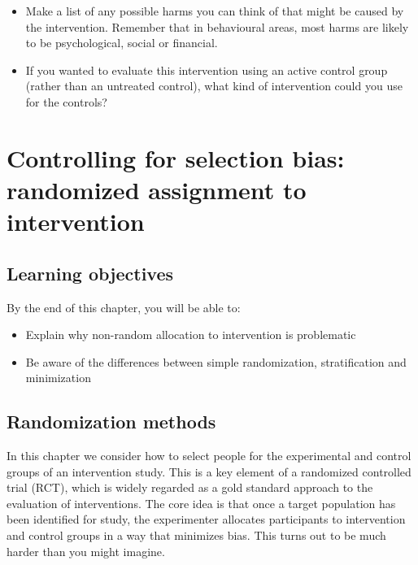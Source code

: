 \documentclass{krantz}
\providecommand{\tightlist}{%
\setlength{\itemsep}{0pt}\setlength{\parskip}{0pt}}
\begin{document}
\begin{itemize}
\tightlist
\item
  Make a list of any possible harms you can think of that might be caused by the intervention. Remember that in behavioural areas, most harms are likely to be psychological, social or financial.
\item
  If you wanted to evaluate this intervention using an active control group (rather than an untreated control), what kind of intervention could you use for the controls?
\end{itemize}

\hypertarget{randomize}{%
\chapter{Controlling for selection bias: randomized assignment to intervention}\label{randomize}}

\hypertarget{learning-objectives-6}{%
\section{Learning objectives}\label{learning-objectives-6}}

By the end of this chapter, you will be able to:

\begin{itemize}
\item
  Explain why non-random allocation to intervention is problematic
\item
  Be aware of the differences between simple randomization, stratification and minimization
\end{itemize}

\hypertarget{randomization-methods}{%
\section{Randomization methods}\label{randomization-methods}}

In this chapter we consider how to select people for the experimental and control groups of an intervention study. This is a key element of a randomized controlled trial (RCT), which is widely regarded as a gold standard approach to the evaluation of interventions. The core idea is that once a target population has been identified for study, the experimenter allocates participants to intervention and control groups in a way that minimizes bias. This turns out to be much harder than you might imagine.
\end{document}
